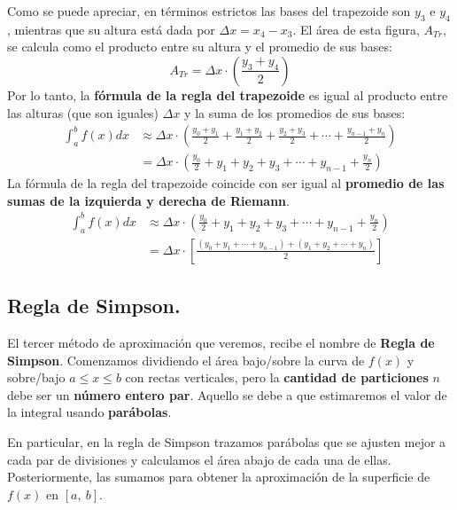 \documentclass[12pt]{article}
\begin{document}
Como se puede apreciar, en términos estrictos las bases del trapezoide son $y_{3}$ e $y_{4}$, mientras que su altura está dada por $\Delta x = x_{4} - x_{3}$. El área de esta figura, $A_{Tr}$,  se calcula como el producto entre su altura y el promedio de sus bases:
\[
  A_{Tr} = \Delta x \cdot \left(\frac{y_{3} + y_{4}}{2}\right)
\]
Por lo tanto, la \textbf{fórmula de la regla del trapezoide} es igual al producto entre las alturas (que son iguales) $\Delta x$ y la suma de los promedios de sus bases:
\begin{align*}
  \int_{a}^{b} f(x)dx &\approx \Delta x \cdot \left(
      \frac{y_{0} + y_{1}}{2} + \frac{y_{1} + y_{2}}{2} + \frac{y_{2} + y_{3}}{2} + \cdots + \frac{y_{n - 1} + y_{n}}{2}
    \right) \\
                      &= \Delta x \cdot \left(\frac{y_{0}}{2} + y_{1} + y_{2} + y_{3} + \cdots + y_{n - 1} + \frac{y_{n}}{2}\right)
\end{align*}
La fórmula de la regla del trapezoide coincide con ser igual al \textbf{promedio de las sumas de la izquierda y derecha de Riemann}.
\begin{align*}
\int_{a}^{b} f(x)dx &\approx \Delta x \cdot \left(\frac{y_{0}}{2} + y_{1} + y_{2} + y_{3} + \cdots + y_{n - 1} + \frac{y_{n}}{2}\right) \\
                    &= \Delta x \cdot \left[\frac{(y_{0} + y_{1} + \cdots + y_{n - 1}) + (y_{1} + y_{2} + \cdots + y_{n})}{2}\right]
\end{align*}

\subsection{Regla de Simpson.}

El tercer método de aproximación que veremos, recibe el nombre de \textbf{Regla de Simpson}. Comenzamos dividiendo el área bajo/sobre la curva de $f(x)$ y sobre/bajo $a \leq x \leq b$ con rectas verticales, pero la \textbf{cantidad de particiones} $n$ debe ser un \textbf{número entero par}. Aquello se debe a que estimaremos el valor de la integral usando \textbf{parábolas}.

En particular, en la regla de Simpson trazamos parábolas que se ajusten mejor a cada par de divisiones y calculamos el área abajo de cada una de ellas. Posteriormente, las sumamos para obtener la aproximación de la superficie de $f(x)$ en $[a, \ b]$.
\end{document}
